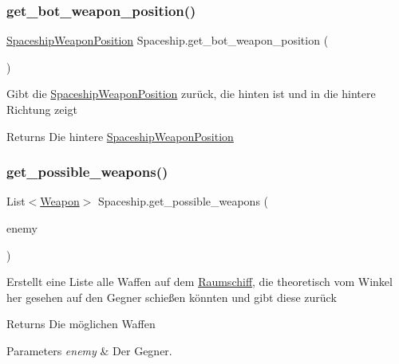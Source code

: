 \subsubsection{\texorpdfstring{get\+\_\+bot\+\_\+weapon\+\_\+position()}{get\_bot\_weapon\_position()}}
{\footnotesize\ttfamily \hyperlink{class_spaceship_weapon_position}{Spaceship\+Weapon\+Position} Spaceship.\+get\+\_\+bot\+\_\+weapon\+\_\+position (\begin{DoxyParamCaption}{ }\end{DoxyParamCaption})}



Gibt die \hyperlink{class_spaceship_weapon_position}{Spaceship\+Weapon\+Position} zurück, die hinten ist und in die hintere Richtung zeigt 

\begin{DoxyReturn}{Returns}
Die hintere \hyperlink{class_spaceship_weapon_position}{Spaceship\+Weapon\+Position} 
\end{DoxyReturn}
\mbox{\label{class_spaceship_aa55156010da7dba1748429efda244d04}} 
\subsubsection{\texorpdfstring{get\+\_\+possible\+\_\+weapons()}{get\_possible\_weapons()}}
{\footnotesize\ttfamily List$<$\hyperlink{class_weapon}{Weapon}$>$ Spaceship.\+get\+\_\+possible\+\_\+weapons (\begin{DoxyParamCaption}\item[{Game\+Object}]{enemy }\end{DoxyParamCaption})}



Erstellt eine Liste alle Waffen auf dem \hyperlink{class_raumschiff}{Raumschiff}, die theoretisch vom Winkel her gesehen auf den Gegner schießen könnten und gibt diese zurück 

\begin{DoxyReturn}{Returns}
Die möglichen Waffen
\end{DoxyReturn}

\begin{DoxyParams}{Parameters}
{\em enemy} & Der Gegner.\\
\hline
\end{DoxyParams}
\mbox{\label{class_spaceship_a78e68df6007c48431f1bddf304226948}} 
